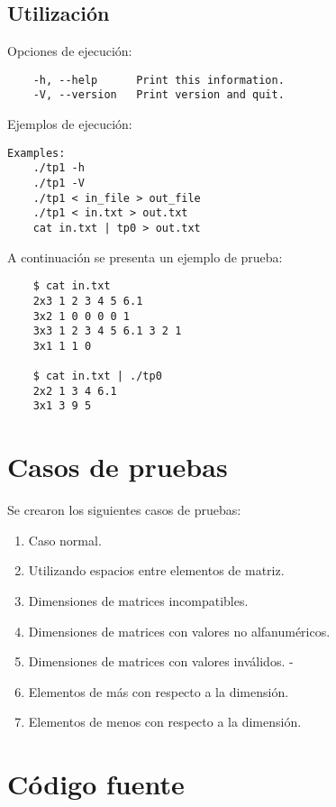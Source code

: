 \documentclass[a4paper,10pt]{article}
\begin{document}
\subsection{Utilizaci\'on}
Opciones de ejecuci\'on:
\begin{verbatim}
	-h, --help		Print this information.
	-V, --version	Print version and quit.
\end{verbatim}

Ejemplos de ejecuci\'on:
\begin{verbatim}
Examples:
	./tp1 -h
	./tp1 -V
	./tp1 < in_file > out_file
	./tp1 < in.txt > out.txt
	cat in.txt | tp0 > out.txt

\end{verbatim}

A continuaci\'on se presenta un ejemplo de prueba:
\begin{verbatim}
	$ cat in.txt
	2x3 1 2 3 4 5 6.1
	3x2 1 0 0 0 0 1
	3x3 1 2 3 4 5 6.1 3 2 1
	3x1 1 1 0

	$ cat in.txt | ./tp0
	2x2 1 3 4 6.1
	3x1 3 9 5
\end{verbatim}
\pagebreak


\section{Casos de pruebas}
Se crearon los siguientes casos de pruebas:
\begin{enumerate}
\item Caso normal.	
\item Utilizando espacios entre elementos de matriz.
\item Dimensiones de matrices incompatibles.
\item Dimensiones de matrices con valores no alfanum\'ericos.
\item Dimensiones de matrices con valores inv\'alidos.
-\item Elementos de m\'as con respecto a la dimensi\'on.
\item Elementos de menos con respecto a la dimensi\'on.
\end{enumerate}				
\pagebreak


\section{C\'odigo fuente}
\end{document}

